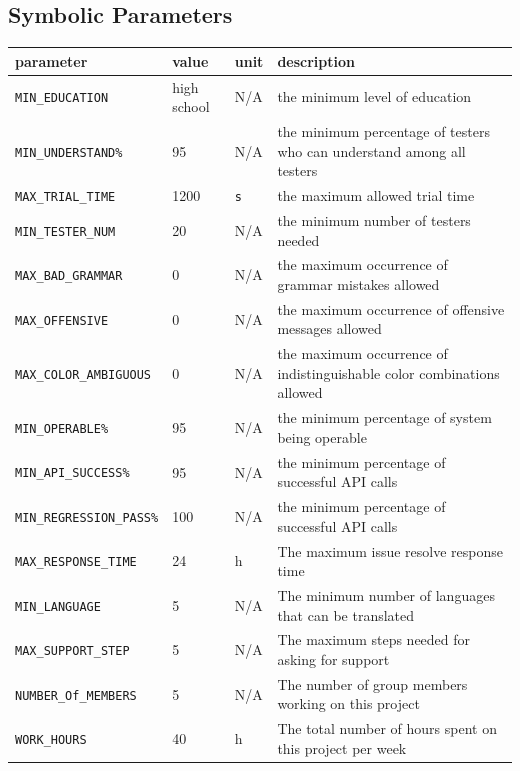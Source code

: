\documentclass[12pt]{article}
\begin{document}
\subsection{Symbolic Parameters}

\begin{tabular}{|l|l|l|p{5cm}|}

\hline
parameter & value & unit & description\\
\hline
\texttt{MIN\_EDUCATION} & high school & N/A & the minimum level of education\\
\hline
\texttt{MIN\_UNDERSTAND\%} & 95 & N/A & the minimum percentage of testers who can understand among all testers\\
\hline
\texttt{MAX\_TRIAL\_TIME} & 1200 & \texttt{s} & the maximum allowed trial time\\
\hline
\texttt{MIN\_TESTER\_NUM} &  20& N/A & the minimum number of testers needed\\
\hline
\texttt{MAX\_BAD\_GRAMMAR} & 0& N/A & the maximum occurrence of grammar mistakes allowed \\
\hline
\texttt{MAX\_OFFENSIVE} & 0& N/A & the maximum occurrence of offensive messages allowed\\
\hline
\texttt{MAX\_COLOR\_AMBIGUOUS} & 0& N/A & the maximum occurrence of indistinguishable color combinations allowed\\
\hline
\texttt{MIN\_OPERABLE\%} & 95 & N/A & the minimum percentage of system being operable \\
\hline
\texttt{MIN\_API\_SUCCESS\%} & 95 & N/A &  the minimum percentage of successful API calls\\
\hline
\texttt{MIN\_REGRESSION\_PASS\%} & 100  & N/A &  the minimum percentage of successful API calls\\
\hline
\texttt{MAX\_RESPONSE\_TIME} & 24 & h & The maximum issue resolve response time\\
\hline
\texttt{MIN\_LANGUAGE}& 5& N/A & The minimum number of languages that can be translated\\
\hline
\texttt{MAX\_SUPPORT\_STEP} & 5&N/A& The maximum steps needed for asking for support\\
\hline
\texttt{NUMBER\_Of\_MEMBERS} & 5&N/A& The number of group members working on this project\\
\hline
\texttt{WORK\_HOURS} & 40 & h & The total number of hours spent on this project per week\\
\hline
\end{tabular}
\end{document}
